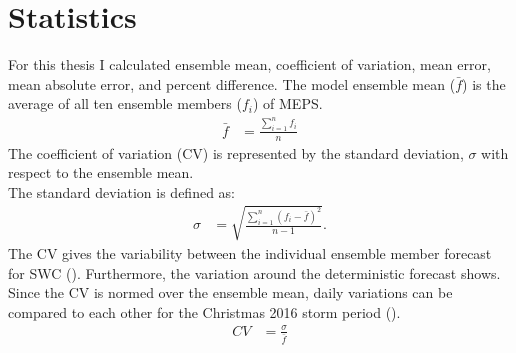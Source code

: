 \section{Statistics}
For this thesis I calculated ensemble mean, coefficient of variation, mean error, mean absolute error, and percent difference. 
\label{sec:ens_mean_spread}
The model ensemble mean ($\bar{f}$) is the average of all ten ensemble members ($f_i$) of MEPS.
\begin{align}
	\bar{f} & = \frac{\sum_{i=1}^n f_i}{n} \label{eq:meanMEPS}
\end{align}
The coefficient of variation (CV) is represented by the standard deviation, $\sigma$  with respect to the ensemble mean.
\\
The standard deviation is defined as:
\begin{align}
	\sigma & = \sqrt{\frac{\sum_{i=1}^n (f_i - \bar{f})^2}{n-1}} .\label{eq:stdMEPS}
\end{align}
The CV gives the variability between the individual ensemble member forecast for SWC (). Furthermore, the variation around the deterministic forecast shows. Since the CV is normed over the ensemble mean, daily variations can be compared to each other for the Christmas 2016 storm period ().
\begin{align}
	CV & = \frac{\sigma}{\bar{f}}
\end{align}
%
